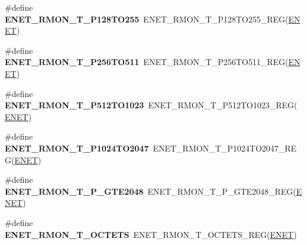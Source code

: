 \begin{DoxyCompactItemize}
\item 
\#define {\bfseries E\+N\+E\+T\+\_\+\+R\+M\+O\+N\+\_\+\+T\+\_\+\+P128\+T\+O255}~E\+N\+E\+T\+\_\+\+R\+M\+O\+N\+\_\+\+T\+\_\+\+P128\+T\+O255\+\_\+\+R\+EG(\hyperlink{group__ENET__Peripheral__Access__Layer_ga4745105f505f3ab949d6a57fbe2a0ed5}{E\+N\+ET})\hypertarget{group__ENET__Register__Accessor__Macros_ga46ecd6f991a973fb35eafaa7520edfa4}{}\label{group__ENET__Register__Accessor__Macros_ga46ecd6f991a973fb35eafaa7520edfa4}

\item 
\#define {\bfseries E\+N\+E\+T\+\_\+\+R\+M\+O\+N\+\_\+\+T\+\_\+\+P256\+T\+O511}~E\+N\+E\+T\+\_\+\+R\+M\+O\+N\+\_\+\+T\+\_\+\+P256\+T\+O511\+\_\+\+R\+EG(\hyperlink{group__ENET__Peripheral__Access__Layer_ga4745105f505f3ab949d6a57fbe2a0ed5}{E\+N\+ET})\hypertarget{group__ENET__Register__Accessor__Macros_ga6b5b079c08add074de625720273e711f}{}\label{group__ENET__Register__Accessor__Macros_ga6b5b079c08add074de625720273e711f}

\item 
\#define {\bfseries E\+N\+E\+T\+\_\+\+R\+M\+O\+N\+\_\+\+T\+\_\+\+P512\+T\+O1023}~E\+N\+E\+T\+\_\+\+R\+M\+O\+N\+\_\+\+T\+\_\+\+P512\+T\+O1023\+\_\+\+R\+EG(\hyperlink{group__ENET__Peripheral__Access__Layer_ga4745105f505f3ab949d6a57fbe2a0ed5}{E\+N\+ET})\hypertarget{group__ENET__Register__Accessor__Macros_ga9681a2de24b0515397a85b0c69d4e8df}{}\label{group__ENET__Register__Accessor__Macros_ga9681a2de24b0515397a85b0c69d4e8df}

\item 
\#define {\bfseries E\+N\+E\+T\+\_\+\+R\+M\+O\+N\+\_\+\+T\+\_\+\+P1024\+T\+O2047}~E\+N\+E\+T\+\_\+\+R\+M\+O\+N\+\_\+\+T\+\_\+\+P1024\+T\+O2047\+\_\+\+R\+EG(\hyperlink{group__ENET__Peripheral__Access__Layer_ga4745105f505f3ab949d6a57fbe2a0ed5}{E\+N\+ET})\hypertarget{group__ENET__Register__Accessor__Macros_ga64849c42635761d448ba9b92129ddf3c}{}\label{group__ENET__Register__Accessor__Macros_ga64849c42635761d448ba9b92129ddf3c}

\item 
\#define {\bfseries E\+N\+E\+T\+\_\+\+R\+M\+O\+N\+\_\+\+T\+\_\+\+P\+\_\+\+G\+T\+E2048}~E\+N\+E\+T\+\_\+\+R\+M\+O\+N\+\_\+\+T\+\_\+\+P\+\_\+\+G\+T\+E2048\+\_\+\+R\+EG(\hyperlink{group__ENET__Peripheral__Access__Layer_ga4745105f505f3ab949d6a57fbe2a0ed5}{E\+N\+ET})\hypertarget{group__ENET__Register__Accessor__Macros_ga6437d0d25e4b3d0f218a27a6f1558eb1}{}\label{group__ENET__Register__Accessor__Macros_ga6437d0d25e4b3d0f218a27a6f1558eb1}

\item 
\#define {\bfseries E\+N\+E\+T\+\_\+\+R\+M\+O\+N\+\_\+\+T\+\_\+\+O\+C\+T\+E\+TS}~E\+N\+E\+T\+\_\+\+R\+M\+O\+N\+\_\+\+T\+\_\+\+O\+C\+T\+E\+T\+S\+\_\+\+R\+EG(\hyperlink{group__ENET__Peripheral__Access__Layer_ga4745105f505f3ab949d6a57fbe2a0ed5}{E\+N\+ET})\hypertarget{group__ENET__Register__Accessor__Macros_gaafd6ce228ef03e734d1f2fa83d19d37c}{}\label{group__ENET__Register__Accessor__Macros_gaafd6ce228ef03e734d1f2fa83d19d37c}


\end{DoxyCompactItemize}
